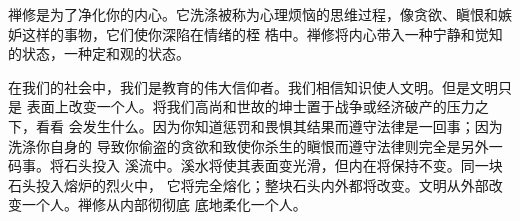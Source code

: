 禅修是为了净化你的内心。它洗涤被称为心理烦恼的思维过程，像贪欲、瞋恨和嫉妒这样的事物，它们使你深陷在情绪的桎
梏中。禅修将内心带入一种宁静和觉知的状态，一种定和观的状态。

在我们的社会中，我们是教育的伟大信仰者。我们相信知识使人文明。但是文明只是
表面上改变一个人。将我们高尚和世故的坤士置于战争或经济破产的压力之下，看看
会发生什么。因为你知道惩罚和畏惧其结果而遵守法律是一回事；因为洗涤你自身的
导致你偷盗的贪欲和致使你杀生的瞋恨而遵守法律则完全是另外一码事。将石头投入
溪流中。溪水将使其表面变光滑，但内在将保持不变。同一块石头投入熔炉的烈火中，
它将完全熔化；整块石头内外都将改变。文明从外部改变一个人。禅修从内部彻彻底
底地柔化一个人。

\endchapter

\vfill\eject\byebye
